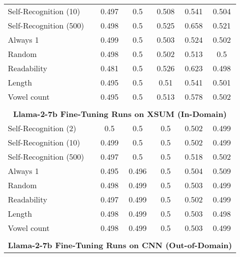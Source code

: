 \begin{table}[h]
\begin{tabular}{l|ccccc}
    Self-Recognition (10)                      & 0.497       & 0.5         & 0.508       & 0.541       & 0.504       \\
    Self-Recognition (500)                     & 0.498       & 0.5         & 0.525       & 0.658       & 0.521       \\
    Always 1                           & 0.499       & 0.5         & 0.503       & 0.524       & 0.502       \\
    Random                             & 0.498       & 0.5         & 0.502       & 0.513       & 0.5         \\
    Readability                        & 0.481       & 0.5         & 0.526       & 0.623       & 0.498       \\
    Length                             & 0.495       & 0.5         & 0.51        & 0.541       & 0.501       \\
    Vowel count                        & 0.495       & 0.5         & 0.513       & 0.578       & 0.502       \\
    \multicolumn{6}{c}{} \\
    \multicolumn{6}{c}{\textbf{Llama-2-7b Fine-Tuning Runs on XSUM (In-Domain)}} \\
    Self-Recognition (2)                       & 0.5         & 0.5         & 0.5         & 0.502       & 0.499       \\
    Self-Recognition (10)                      & 0.499       & 0.5         & 0.5         & 0.502       & 0.499       \\
    Self-Recognition (500)                     & 0.497       & 0.5         & 0.5         & 0.518       & 0.502       \\
    Always 1                           & 0.495       & 0.496       & 0.5         & 0.504       & 0.509       \\
    Random                             & 0.498       & 0.499       & 0.5         & 0.503       & 0.499       \\
    Readability                        & 0.497       & 0.499       & 0.5         & 0.502       & 0.499       \\
    Length                             & 0.498       & 0.499       & 0.5         & 0.503       & 0.498       \\
    Vowel count                        & 0.498       & 0.499       & 0.5         & 0.503       & 0.499       \\
    \multicolumn{6}{c}{} \\
    \multicolumn{6}{c}{\textbf{Llama-2-7b Fine-Tuning Runs on CNN (Out-of-Domain)}} \\

\end{tabular}
\end{table}
